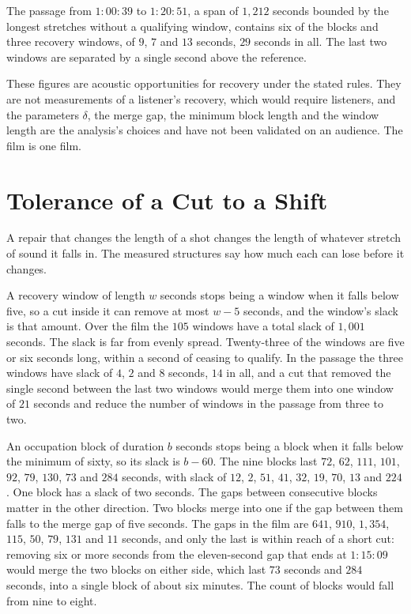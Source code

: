 \documentclass[11pt,twoside,openright]{book}
\theoremstyle{plain}
\theoremstyle{definition}
\theoremstyle{remark}
\begin{document}
The passage from $1{:}00{:}39$ to $1{:}20{:}51$, a span of $1{,}212$ seconds bounded by the longest stretches without a qualifying window, contains six of the blocks and three recovery windows, of $9$, $7$ and $13$ seconds, $29$ seconds in all. The last two windows are separated by a single second above the reference.

These figures are acoustic opportunities for recovery under the stated rules. They are not measurements of a listener's recovery, which would require listeners, and the parameters $\delta$, the merge gap, the minimum block length and the window length are the analysis's choices and have not been validated on an audience. The film is one film.

\section{Tolerance of a Cut to a Shift}\label{sec:tolerance}

A repair that changes the length of a shot changes the length of whatever stretch of sound it falls in. The measured structures say how much each can lose before it changes.

A recovery window of length $w$ seconds stops being a window when it falls below five, so a cut inside it can remove at most $w-5$ seconds, and the window's slack is that amount. Over the film the $105$ windows have a total slack of $1{,}001$ seconds. The slack is far from evenly spread. Twenty-three of the windows are five or six seconds long, within a second of ceasing to qualify. In the passage the three windows have slack of $4$, $2$ and $8$ seconds, $14$ in all, and a cut that removed the single second between the last two windows would merge them into one window of $21$ seconds and reduce the number of windows in the passage from three to two.

An occupation block of duration $b$ seconds stops being a block when it falls below the minimum of sixty, so its slack is $b-60$. The nine blocks last $72$, $62$, $111$, $101$, $92$, $79$, $130$, $73$ and $284$ seconds, with slack of $12$, $2$, $51$, $41$, $32$, $19$, $70$, $13$ and $224$. One block has a slack of two seconds. The gaps between consecutive blocks matter in the other direction. Two blocks merge into one if the gap between them falls to the merge gap of five seconds. The gaps in the film are $641$, $910$, $1{,}354$, $115$, $50$, $79$, $131$ and $11$ seconds, and only the last is within reach of a short cut: removing six or more seconds from the eleven-second gap that ends at $1{:}15{:}09$ would merge the two blocks on either side, which last $73$ seconds and $284$ seconds, into a single block of about six minutes. The count of blocks would fall from nine to eight.
\end{document}
